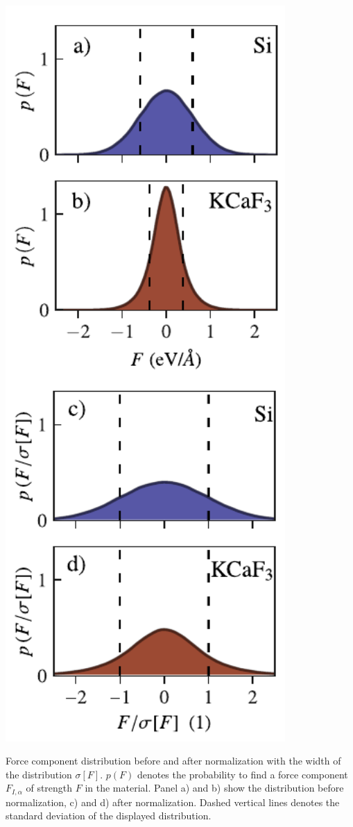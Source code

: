 \begin{marginfigure}
	\centering
	\includegraphics[width=0.8\textwidth]{./data/plots/anharmonicity/4_force_distribution/histogram_forces_vertical.pdf}
	\caption{
		Force component distribution before and after normalization with the width of the distribution $\sigma [F]$. $p(F)$ denotes the probability to find a force component $F_{I, \alpha}$ of strength $F$ in the material. Panel a) and b) show the distribution before normalization, c) and d) after normalization. Dashed vertical lines denotes the standard deviation of the displayed distribution.
	}
	\label{fig:anh.normalization}
\end{marginfigure}

